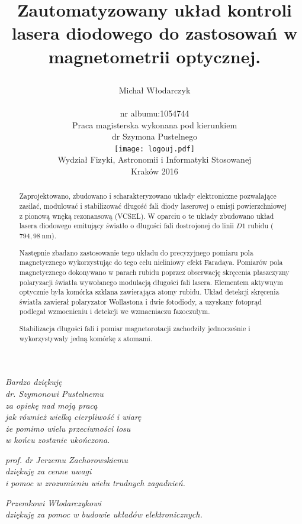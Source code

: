 \documentclass[a4paper,10pt,twoside]{report}
\author{\begin{Large}Michał Włodarczyk\end{Large}\\\vspace{100pt} nr albumu:1054744\\
 Praca magisterska wykonana pod kierunkiem\\
\vspace{100pt} dr Szymona Pustelnego
\\\texttt{[image: logouj.pdf]} \vspace{20pt} \\Wydział Fizyki, Astronomii i Informatyki Stosowanej\\Kraków 2016}
\title{\begin{LARGE}\textbf{Zautomatyzowany układ kontroli lasera diodowego do zastosowań w magnetometrii optycznej.}\end{LARGE}}
\date{}
\begin{document}
\maketitle
\thispagestyle{plain}


\begin{flushright}{\textit{Bardzo dziękuję \\ \vspace{5pt}
 dr. Szymonowi Pustelnemu \\
za opiekę nad moją pracą \\
jak również wielką cierpliwość i wiarę\\
że pomimo wielu przeciwności losu\\ w końcu zostanie ukończona.}}\vspace{20pt}

{\textit{prof. dr Jerzemu Zachorowskiemu\\dziękuję za cenne uwagi\\ i pomoc w zrozumieniu wielu trudnych zagadnień.}}\vspace{20pt}

{\textit{Przemkowi Włodarczykowi\\dziękuję za pomoc w budowie układów elektronicznych.}}\vspace{20pt}

\end{flushright}

\vspace{15cm}


\newpage
\mbox{}
\newpage
\tableofcontents



\begin{abstract}
Zaprojektowano, zbudowano i scharakteryzowano układy elektroniczne pozwalające zasilać, modulować i stabilizować długość fali diody laserowej o emisji powierzchniowej z pionową wnęką rezonansową (VCSEL). W oparciu o te układy zbudowano układ lasera diodowego emitujący światło o długości fali dostrojonej do linii $D1$ rubidu ($794{,}98~ \mathrm{nm}$).

Następnie zbadano zastosowanie tego układu do precyzyjnego pomiaru pola magnetycznego wykorzystując do tego celu nieliniowy efekt Faradaya. Pomiarów pola magnetycznego dokonywano w parach rubidu poprzez obserwację skręcenia płaszczyzny polaryzacji światła wywołanego modulacją długości fali lasera. Elementem aktywnym optycznie była komórka szklana zawierająca atomy rubidu.  Układ detekcji skręcenia światła zawierał polaryzator Wollastona i dwie fotodiody, a uzyskany fotoprąd podlegał wzmocnieniu i detekcji we wzmacniaczu fazoczułym. 

Stabilizacja długości fali i pomiar magnetorotacji zachodziły jednocześnie i wykorzystywały jedną komórkę z atomami.
 
\end{abstract}
\end{document}

